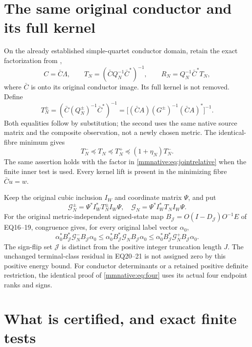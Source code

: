 \documentclass[11pt]{article}
\begin{document}
\section{The same original conductor and its full kernel}

On the already established simple-quartet conductor domain, retain
the exact factorization from \cite{mmnative:EQ,mmnative:TR},
\[
 C=\bar C\Lambda,
 \qquad T_N=(\bar C Q_N^{-1}\bar C^*)^{-1},
 \qquad R_N=Q_N^{-1}\bar C^*T_N,
\]
where $\bar C$ is onto its original conductor image.  Its full
kernel is not removed.  Define
\begin{equation}\label{mmnative:eq:conductor}
 T_N^\pm=(\bar C(Q_N^\pm)^{-1}\bar C^*)^{-1}
 =\bigl[(\bar CA)(G^\pm)^{-1}(\bar CA)^*\bigr]^{-1}.
\end{equation}
Both equalities follow by substitution; the second uses the same
native source matrix and the composite observation, not a newly
chosen metric.  The identical-fibre minimum gives
\[
 T_N^-\preceq T_N\preceq T_N^+
 \preceq(1+\eta_N)T_N^-.
\]
The same assertion holds with the factor in \eqref{mmnative:eq:jointrelative}
when the finite inner test is used.  Every kernel lift is present in
the minimizing fibre $\bar Cu=w$.

Keep the original cubic inclusion $I_W$ and coordinate matrix $\Psi$,
and put
\[
 \mathcal G_N^\pm=\Psi^*I_W^*T_N^\pm I_W\Psi,
 \quad\mathcal G_N=\Psi^*I_W^*T_NI_W\Psi.
\]
For the original metric-independent signed-state map
$B_{\mathcal J}=O(I-D_{\mathcal J})O^{-1}E$ of EQ16--19, congruence
gives, for every original label vector $\alpha_0$,
\begin{equation}\label{mmnative:eq:defect}
 \alpha_0^*B_{\mathcal J}^*\mathcal G_N^-B_{\mathcal J}\alpha_0
 \le\alpha_0^*B_{\mathcal J}^*\mathcal G_NB_{\mathcal J}\alpha_0
 \le\alpha_0^*B_{\mathcal J}^*\mathcal G_N^+B_{\mathcal J}\alpha_0.
\end{equation}
The sign-flip set $\mathcal J$ is distinct from the positive integer
truncation length $J$.  The unchanged terminal-class residual in
EQ20--21 is not assigned zero by this positive energy bound.  For
conductor determinants or a retained positive definite restriction,
the identical proof of \eqref{mmnative:eq:four} uses its actual four endpoint
ranks and signs.

\section{What is certified, and exact finite tests}
\end{document}
